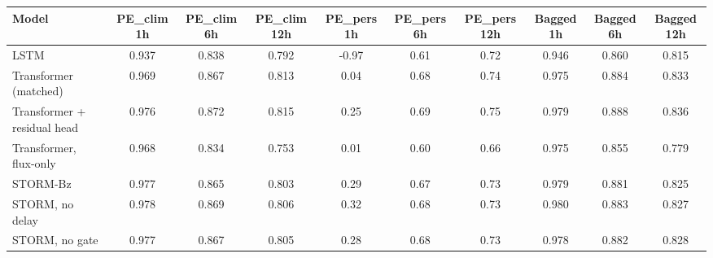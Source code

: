 \begin{tabular}{lccccccccc}
\toprule
Model & PE\_clim 1h & PE\_clim 6h & PE\_clim 12h & PE\_pers 1h & PE\_pers 6h & PE\_pers 12h & Bagged 1h & Bagged 6h & Bagged 12h \\
\midrule
LSTM & 0.937 & 0.838 & 0.792 & -0.97 & 0.61 & 0.72 & 0.946 & 0.860 & 0.815 \\
Transformer (matched) & 0.969 & 0.867 & 0.813 & 0.04 & 0.68 & 0.74 & 0.975 & 0.884 & 0.833 \\
Transformer + residual head & 0.976 & 0.872 & 0.815 & 0.25 & 0.69 & 0.75 & 0.979 & 0.888 & 0.836 \\
Transformer, flux-only & 0.968 & 0.834 & 0.753 & 0.01 & 0.60 & 0.66 & 0.975 & 0.855 & 0.779 \\
STORM-Bz & 0.977 & 0.865 & 0.803 & 0.29 & 0.67 & 0.73 & 0.979 & 0.881 & 0.825 \\
STORM, no delay & 0.978 & 0.869 & 0.806 & 0.32 & 0.68 & 0.73 & 0.980 & 0.883 & 0.827 \\
STORM, no gate & 0.977 & 0.867 & 0.805 & 0.28 & 0.68 & 0.73 & 0.978 & 0.882 & 0.828 \\
\bottomrule
\end{tabular}
